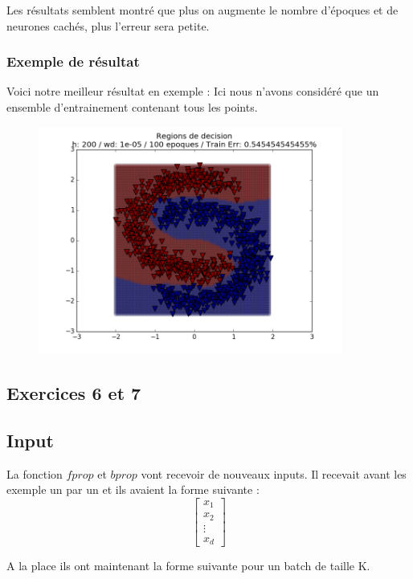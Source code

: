 \documentclass[a4paper,11pt]{article}
\begin{document}
Les résultats semblent montré que plus on augmente le nombre d'époques et de neurones cachés, plus l'erreur sera petite.

\subsubsection{Exemple de résultat}
Voici notre meilleur résultat en exemple :
Ici nous n'avons considéré que un ensemble d'entrainement contenant tous les points.

\begin{figure}[H]
	\includegraphics[width=10cm]{images/exo5-under1.png}
	\centering
	\label{fig:comp}
\end{figure}




\subsection{Exercices 6 et 7	}
\subsection{Input}

La fonction $fprop$ et $bprop$ vont recevoir de nouveaux inputs.
Il recevait avant les exemple un par un et ils avaient la forme suivante :
\[
\begin{bmatrix}
    x_{1}  \\
    x_{2}  \\
    \vdots  \\
    x_{d} 
\end{bmatrix}
\]

A la place ils ont maintenant la forme suivante pour un batch de taille K. 
\end{document}

